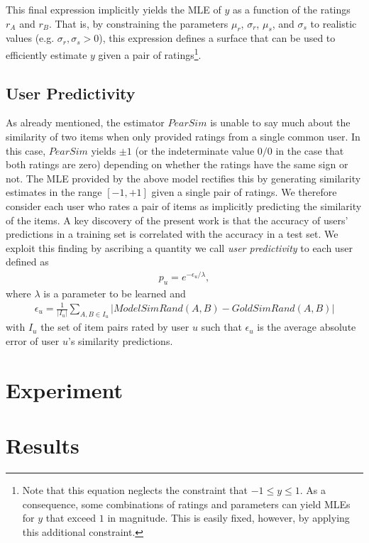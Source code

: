 \documentclass[11pt]{article}
\begin{document}
This final expression implicitly yields the MLE of $y$ as a function of the
ratings $r_A$ and $r_B$. That is, by constraining the parameters $\mu_r$,
$\sigma_r$, $\mu_s$, and $\sigma_s$ to realistic values (e.g. $\sigma_r,
\sigma_s > 0$), this expression defines a surface that can be used to
efficiently estimate $y$ given a pair of ratings\footnote{Note that this
equation neglects the constraint that $-1 \leq y \leq 1$. As a consequence, some
combinations of ratings and parameters can yield MLEs for $y$ that exceed $1$ in
magnitude. This is easily fixed, however, by applying this additional
constraint.}.

\subsection*{User Predictivity}

As already mentioned, the estimator $PearSim$ is unable to say much about the
similarity of two items when only provided ratings from a single common user. In
this case, $PearSim$ yields $\pm1$ (or the indeterminate value $0/0$ in the case
that both ratings are zero) depending on whether the ratings have the same sign
or not. The MLE provided by the above model rectifies this by generating
similarity estimates in the range $[-1, +1]$ given a single pair of ratings. We
therefore consider each user who rates a pair of items as implicitly predicting
the similarity of the items. A key discovery of the present work is that the
accuracy of users' predictions in a training set is correlated with the accuracy
in a test set. We exploit this finding by ascribing a quantity we call {\em user
predictivity} to each user defined as
\begin{align}
p_u = e^{-\epsilon_u/\lambda},
\end{align}
where $\lambda$ is a parameter to be learned and
\begin{align}
\epsilon_u = \frac{1}{\left|I_u\right|}
\sum_{A,B \in I_u}{\left|ModelSimRand(A, B) - GoldSimRand(A, B)\right|}
\end{align}
with $I_u$ the set of item pairs rated by user $u$ such that $\epsilon_u$ is
the average absolute error of user $u$'s similarity predictions.

\section*{Experiment}

\section*{Results}
\end{document}

